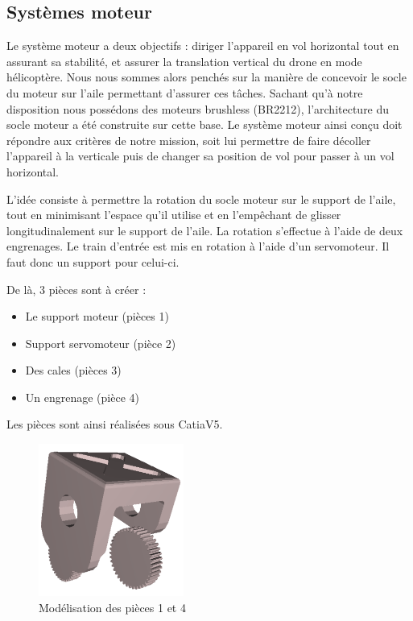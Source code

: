 \documentclass[a4paper,12pt,french]{report}
\begin{document}
\newpage
\subsection{Systèmes moteur}

Le système moteur a deux objectifs : diriger l'appareil en vol horizontal tout en assurant sa stabilité, et assurer la translation vertical du drone en mode hélicoptère. Nous nous sommes alors penchés sur la manière de concevoir le socle du moteur sur l’aile permettant d'assurer ces tâches. Sachant qu’à notre disposition nous possédons des moteurs brushless (BR2212), l’architecture du socle moteur a été construite sur cette base. Le système moteur ainsi conçu doit répondre aux critères de notre mission, soit lui permettre de faire décoller l’appareil à la verticale puis de changer sa position de vol pour passer à un vol horizontal. \newline

L’idée consiste à permettre la rotation du socle moteur sur le support de l’aile, tout en minimisant l’espace qu’il utilise et en l’empêchant de glisser longitudinalement sur le support de l’aile. La rotation s’effectue à l’aide de deux engrenages. Le train d’entrée est mis en rotation à l’aide d’un servomoteur. Il faut donc un support pour celui-ci.\newline

De là, 3 pièces sont à créer :
\begin{itemize}
    \item Le support moteur (pièces 1)
    \item Support servomoteur (pièce 2)
    \item Des cales (pièces 3)
    \item Un engrenage (pièce 4)\newline
\end{itemize}

Les pièces sont ainsi réalisées sous CatiaV5.

\begin{figure}[h]
    \centering
    \includegraphics[height=5cm]{figures/mot1.png}
    \caption{Modélisation des pièces 1 et 4}
\end{figure}
\end{document}
